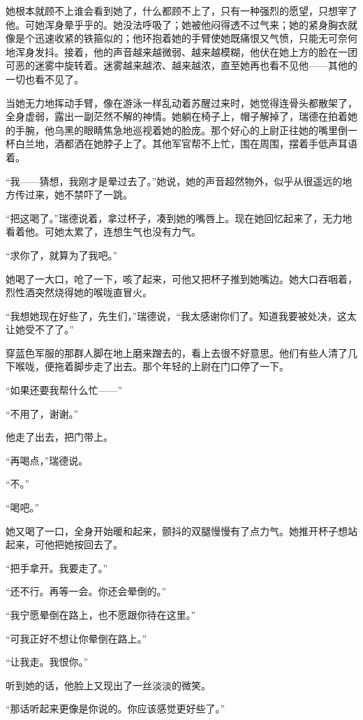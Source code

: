 \par 她根本就顾不上谁会看到她了，什么都顾不上了，只有一种强烈的愿望，只想宰了他。可她浑身晕乎乎的。她没法呼吸了；她被他闷得透不过气来；她的紧身胸衣就像是个迅速收紧的铁箍似的；他环抱着她的手臂使她既痛恨又气愤，只能无可奈何地浑身发抖。接着，他的声音越来越微弱、越来越模糊，他伏在她上方的脸在一团可恶的迷雾中旋转着。迷雾越来越浓、越来越浓，直至她再也看不见他——其他的一切也看不见了。
\par 当她无力地挥动手臂，像在游泳一样乱动着苏醒过来时，她觉得连骨头都散架了，全身虚弱，露出一副茫然不解的神情。她躺在椅子上，帽子解掉了，瑞德在拍着她的手腕，他乌黑的眼睛焦急地巡视着她的脸庞。那个好心的上尉正往她的嘴里倒一杯白兰地，酒都洒在她脖子上了。其他军官帮不上忙，围在周围，摆着手低声耳语着。
\par “我——猜想，我刚才是晕过去了。”她说，她的声音超然物外，似乎从很遥远的地方传过来，她不禁吓了一跳。
\par “把这喝了。”瑞德说着，拿过杯子，凑到她的嘴唇上。现在她回忆起来了，无力地看着他。可她太累了，连想生气也没有力气。
\par “求你了，就算为了我吧。”
\par 她喝了一大口，呛了一下，咳了起来，可他又把杯子推到她嘴边。她大口吞咽着，烈性酒突然烧得她的喉咙直冒火。
\par “我想她现在好些了，先生们，”瑞德说，“我太感谢你们了。知道我要被处决，这太让她受不了了。”
\par 穿蓝色军服的那群人脚在地上磨来蹭去的，看上去很不好意思。他们有些人清了几下喉咙，便拖着脚步走了出去。那个年轻的上尉在门口停了一下。
\par “如果还要我帮什么忙——”
\par “不用了，谢谢。”
\par 他走了出去，把门带上。
\par “再喝点，”瑞德说。
\par “不。”
\par “喝吧。”
\par 她又喝了一口，全身开始暖和起来，颤抖的双腿慢慢有了点力气。她推开杯子想站起来，可他把她按回去了。
\par “把手拿开。我要走了。”
\par “还不行。再等一会。你还会晕倒的。”
\par “我宁愿晕倒在路上，也不愿跟你待在这里。”
\par “可我正好不想让你晕倒在路上。”
\par “让我走。我恨你。”
\par 听到她的话，他脸上又现出了一丝淡淡的微笑。
\par “那话听起来更像是你说的。你应该感觉更好些了。”
